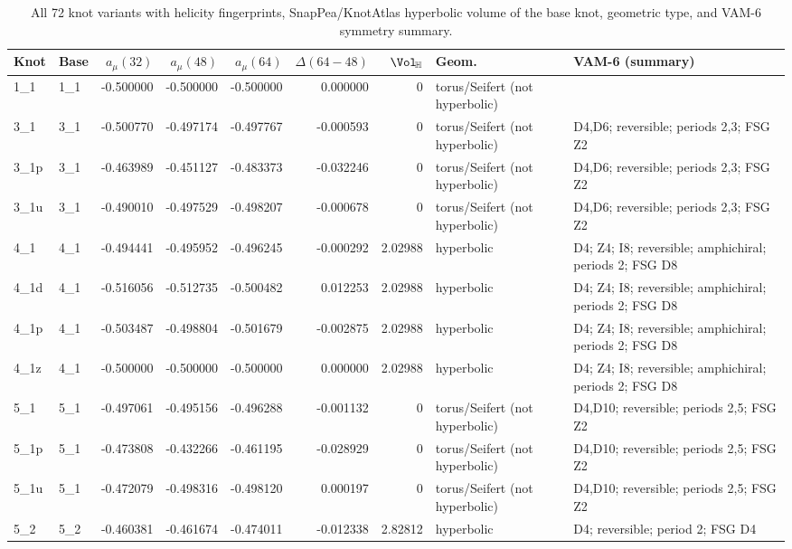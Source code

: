 \begin{table}[h!]
\centering
\scriptsize
\setlength{\tabcolsep}{4pt}
\caption{All 72 knot variants with helicity fingerprints, SnapPea/KnotAtlas hyperbolic volume of the base knot, geometric type, and VAM-6 symmetry summary.}
\label{tab:sst72_volh_vam6}
\begin{tabular}{llrrrrrll}
\toprule
Knot & Base & $a_\mu(32)$ & $a_\mu(48)$ & $a_\mu(64)$ & $\Delta(64{-}48)$ & $\Vol_{\!\mathbb{H}}$ & Geom. & VAM-6 (summary) \\
\midrule
1\_1 & 1\_1 & -0.500000 & -0.500000 & -0.500000 & 0.000000 & 0 & torus/Seifert (not hyperbolic) &  \\
3\_1 & 3\_1 & -0.500770 & -0.497174 & -0.497767 & -0.000593 & 0 & torus/Seifert (not hyperbolic) & D4,D6; reversible; periods 2,3; FSG Z2 \\
3\_1p & 3\_1 & -0.463989 & -0.451127 & -0.483373 & -0.032246 & 0 & torus/Seifert (not hyperbolic) & D4,D6; reversible; periods 2,3; FSG Z2 \\
3\_1u & 3\_1 & -0.490010 & -0.497529 & -0.498207 & -0.000678 & 0 & torus/Seifert (not hyperbolic) & D4,D6; reversible; periods 2,3; FSG Z2 \\
4\_1 & 4\_1 & -0.494441 & -0.495952 & -0.496245 & -0.000292 & 2.02988 & hyperbolic & D4; Z4; I8; reversible; amphichiral; periods 2; FSG D8 \\
4\_1d & 4\_1 & -0.516056 & -0.512735 & -0.500482 & 0.012253 & 2.02988 & hyperbolic & D4; Z4; I8; reversible; amphichiral; periods 2; FSG D8 \\
4\_1p & 4\_1 & -0.503487 & -0.498804 & -0.501679 & -0.002875 & 2.02988 & hyperbolic & D4; Z4; I8; reversible; amphichiral; periods 2; FSG D8 \\
4\_1z & 4\_1 & -0.500000 & -0.500000 & -0.500000 & 0.000000 & 2.02988 & hyperbolic & D4; Z4; I8; reversible; amphichiral; periods 2; FSG D8 \\
5\_1 & 5\_1 & -0.497061 & -0.495156 & -0.496288 & -0.001132 & 0 & torus/Seifert (not hyperbolic) & D4,D10; reversible; periods 2,5; FSG Z2 \\
5\_1p & 5\_1 & -0.473808 & -0.432266 & -0.461195 & -0.028929 & 0 & torus/Seifert (not hyperbolic) & D4,D10; reversible; periods 2,5; FSG Z2 \\
5\_1u & 5\_1 & -0.472079 & -0.498316 & -0.498120 & 0.000197 & 0 & torus/Seifert (not hyperbolic) & D4,D10; reversible; periods 2,5; FSG Z2 \\
5\_2 & 5\_2 & -0.460381 & -0.461674 & -0.474011 & -0.012338 & 2.82812 & hyperbolic & D4; reversible; period 2; FSG D4 \\

\end{tabular}
\end{table}
